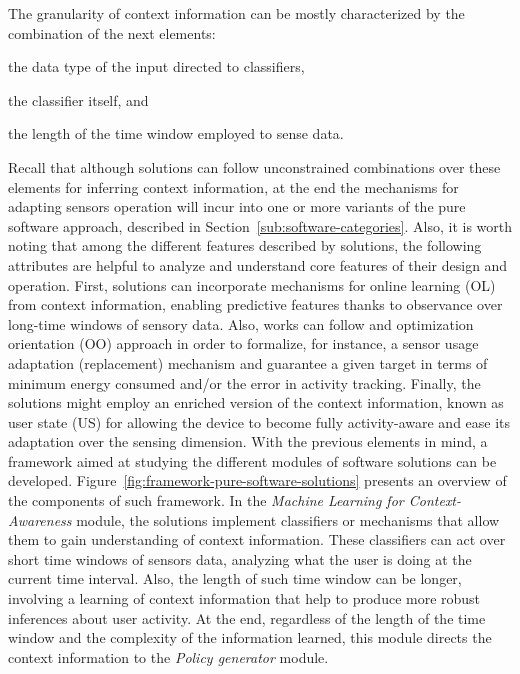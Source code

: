 \documentclass[ENG,PhD]{cinvestav}
\begin{document}
The granularity of context information can be mostly characterized by the combination of the next elements: 
\begin{listahorizontal}
  \item the data type of the input directed to classifiers,
  \item the classifier itself, and
  \item the length of the time window employed to sense data.
\end{listahorizontal}
Recall that although solutions can follow unconstrained combinations over these elements for inferring context information, at the end the mechanisms for adapting sensors operation will incur into one or more variants of the pure software approach, described in Section~\ref{sub:software-categories}.
Also, it is worth noting that among the different features described by solutions, the following attributes are helpful to analyze and understand core features of their design and operation.
First, solutions can incorporate mechanisms for online learning (OL) from context information, enabling predictive features thanks to observance over long-time windows of sensory data.
Also, works can follow and optimization orientation (OO) approach in order to formalize, for instance, a sensor usage adaptation (replacement) mechanism and guarantee a given target in terms of minimum energy consumed and/or the error in activity tracking.
Finally, the solutions might employ an enriched version of the context information, known as user state (US) for allowing the device to become fully activity-aware and ease its adaptation over the sensing dimension.
With the previous elements in mind, a framework aimed at studying the different modules of software solutions can be developed.
Figure~\ref{fig:framework-pure-software-solutions} presents an overview of the components of such framework.
In the \emph{Machine Learning for Context-Awareness} module, the solutions implement classifiers or mechanisms that allow them to gain understanding of context information.
These classifiers can act over short time windows of sensors data, analyzing what the user is doing at the current time interval.
Also, the length of such time window can be longer, involving a learning of context information that help to produce more robust inferences about user activity.
At the end, regardless of the length of the time window and the complexity of the information learned, this module directs the context information to the \emph{Policy generator} module.
\end{document}
